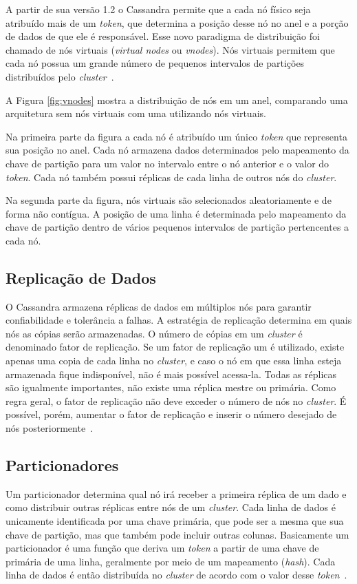 A partir de sua versão 1.2 o Cassandra permite que a cada nó físico seja atribuído mais de um \emph{token}, que determina a posição desse nó no anel e a porção de dados de que ele é responsável. Esse novo paradigma de distribuição foi chamado de nós virtuais (\emph{virtual nodes} ou \emph{vnodes}).
Nós virtuais permitem que cada nó possua um grande número de pequenos intervalos de partições distribuídos pelo \emph{cluster}~\cite{cassandravnodes}.

A Figura \ref{fig:vnodes} mostra a distribuição de nós em um anel, comparando uma arquitetura sem nós virtuais com uma utilizando nós virtuais. 

Na primeira parte da figura a cada nó é atribuído um único \emph{token} que representa sua posição no anel. Cada nó armazena dados determinados pelo mapeamento da chave de partição para um valor no intervalo entre o nó anterior e o valor do \emph{token}. Cada nó também possui réplicas de cada linha de outros nós do \emph{cluster}. 

Na segunda parte da figura, nós virtuais são selecionados aleatoriamente e de forma não contígua. A posição de uma linha é determinada pelo mapeamento da chave de partição dentro de vários pequenos intervalos de partição pertencentes a cada nó.



\subsection*{Replicação de Dados}
O Cassandra armazena réplicas de dados em múltiplos nós para garantir confiabilidade e tolerância a falhas. A estratégia de replicação determina em quais nós as cópias serão armazenadas. O número de cópias em um \emph{cluster} é denominado fator de replicação. Se um fator de replicação um é utilizado, existe apenas uma copia de cada linha no \emph{cluster}, e caso o nó em que essa linha esteja armazenada fique indisponível, não é mais possível acessa-la. Todas as réplicas são igualmente importantes, não existe uma réplica mestre ou primária. Como regra geral, o fator de replicação não deve exceder o número de nós no \emph{cluster}. É possível, porém, aumentar o fator de replicação e inserir o número desejado de nós posteriormente~\cite{cassandradocs}.

\subsection*{Particionadores}
Um particionador determina qual nó irá receber a primeira réplica de um dado e como distribuir outras réplicas entre nós de um \emph{cluster}. Cada linha de dados é unicamente identificada por uma chave primária, que pode ser a mesma que sua chave de partição, mas que também pode incluir outras colunas. Basicamente um particionador é uma função que deriva um \emph{token} a partir de uma chave de primária de uma linha, geralmente por meio de um mapeamento (\emph{hash}). Cada linha de dados é então distribuída no \emph{cluster} de acordo com o valor desse \emph{token}~\cite{cassandradocs}. 

